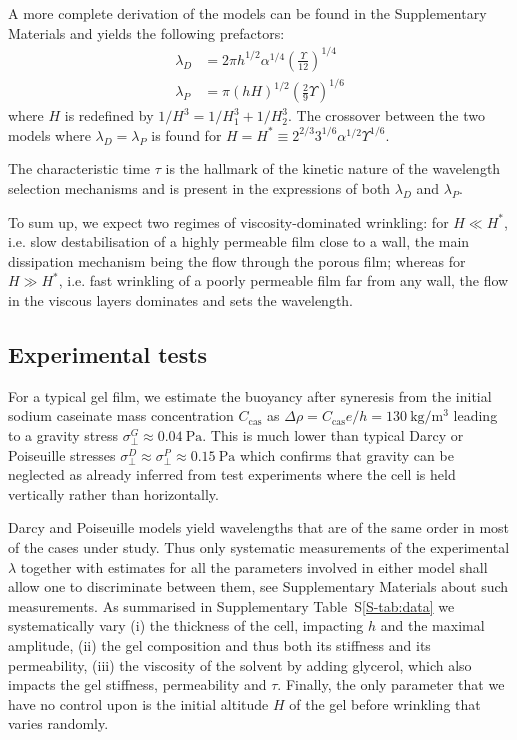 \documentclass[twocolumn,superscriptaddress,showpacs,preprintnumbers, amsmath,amssymb,prl]{revtex4-1}
\begin{document}
A more complete derivation of the models can be found in the Supplementary Materials and yields the following prefactors:
\begin{align}
\lambda_D &= 2\pi h^{1/2}\alpha^{1/4}\left(\frac{\Upsilon}{12}\right)^{1/4}\label{eq:prefDarcy}\\
\lambda_P &= \pi (hH)^{1/2}\left(\frac{2}{9}\Upsilon\right)^{1/6}\label{eq:prefPoiseuille}
\end{align}
where $H$ is redefined by $1/H^3 = 1/H_1^3 + 1/H_2^3$. The crossover between the two models where $\lambda_D=\lambda_P$ is found for $H = H^* \equiv 2^{2/3} 3^{1/6} \alpha^{1/2} \Upsilon^{1/6}$.

The characteristic time $\tau$ is the hallmark of the kinetic nature of the wavelength selection mechanisms and is present in the expressions of both $\lambda_D$ and $\lambda_P$. 

To sum up, we expect two regimes of viscosity-dominated wrinkling: for $H\ll H^*$, i.e. slow destabilisation of a highly permeable film close to a wall, the main dissipation mechanism being the flow through the porous film; whereas for $H\gg H^*$, i.e. fast wrinkling of a poorly permeable film far from any wall, the flow in the viscous layers dominates and sets the wavelength.

\subsection*{Experimental tests}

For a typical gel film, we estimate the buoyancy after syneresis from the initial sodium caseinate mass concentration $C_\text{cas}$ as $\Delta\rho=C_\text{cas} e/h = \SI{130}{\kilo\gram\per\cubic\metre}$ leading to a gravity stress $\sigma_\perp^G \approx \SI{0.04}{\pascal}$. This is much lower than typical Darcy or Poiseuille stresses $\sigma_\perp^D \approx \sigma_\perp^P \approx \SI{0.15}{\pascal}$ which confirms that gravity can be neglected as already inferred from test experiments where the cell is held vertically rather than horizontally.


Darcy and Poiseuille models yield wavelengths that are of the same order in most of the cases under study. Thus only systematic measurements of the experimental $\lambda$ together with estimates for all the parameters involved in either model shall allow one to discriminate between them, see Supplementary Materials about such measurements. As summarised in Supplementary Table~S\ref{S-tab:data} we systematically vary (i) the thickness of the cell, impacting $h$ and the maximal amplitude, (ii) the gel composition and thus both its stiffness and its permeability, (iii) the viscosity of the solvent by adding glycerol, which also impacts the gel stiffness, permeability and $\tau$. Finally, the only parameter that we have no control upon is the initial altitude $H$ of the gel before wrinkling that varies randomly. 
\end{document}

